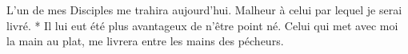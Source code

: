 L’un de mes Disciples me trahira aujourd’hui. Malheur à celui par lequel je serai livré. * Il lui eut été plus avantageux de n’être point né.
\versseparator
Celui qui met avec moi la main au plat, me livrera entre les mains des pécheurs.